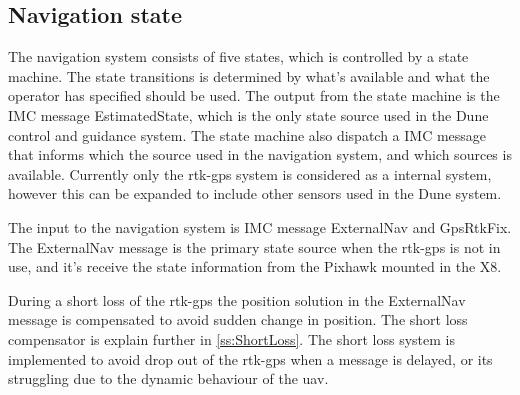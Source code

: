 \subsection{Navigation state}
The navigation system consists of five states, which is controlled by a state machine. The state transitions is determined by what's available and what the operator has specified should be used. The output from the state machine is the IMC message EstimatedState, which is the only state source used in the Dune control and guidance system. The state machine also dispatch a IMC message that informs which the source used in the navigation system, and which sources is available. Currently only the \gls{rtk-gps} system is considered as a internal system, however this can be expanded to include other sensors used in the Dune system.

The input to the navigation system is IMC message ExternalNav and GpsRtkFix. The ExternalNav message is the primary state source when the \gls{rtk-gps} is not in use, and it's receive the state information from the Pixhawk mounted in the X8.

During a short loss of the \gls{rtk-gps} the position solution in the ExternalNav message is compensated to avoid sudden change in position. The short loss compensator is explain further in \ref{ss:ShortLoss}. The short loss system is implemented to avoid drop out of the \gls{rtk-gps} when a message is delayed, or its struggling due to the dynamic behaviour of the \gls{uav}.

